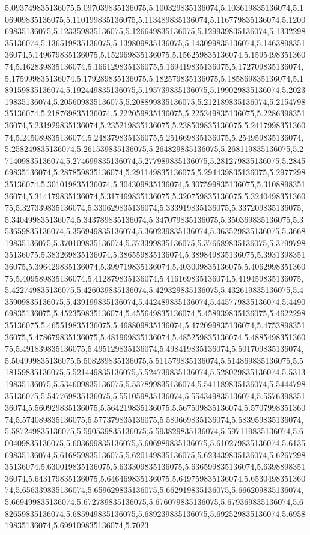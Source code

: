 5.093749835136075,5.097039835136075,5.100329835136074,5.103619835136074,5.106909835136075,5.110199835136075,5.113489835136074,5.116779835136074,5.120069835136075,5.123359835136075,5.126649835136075,5.129939835136074,5.133229835136074,5.136519835136075,5.139809835136075,5.143099835136074,5.146389835136074,5.149679835136075,5.152969835136075,5.156259835136074,5.159549835136074,5.162839835136074,5.166129835136075,5.169419835136075,5.172709835136074,5.175999835136074,5.179289835136075,5.182579835136075,5.185869835136074,5.189159835136074,5.192449835136075,5.195739835136075,5.199029835136074,5.202319835136074,5.205609835136075,5.208899835136075,5.212189835136074,5.215479835136074,5.218769835136074,5.222059835136075,5.225349835136075,5.228639835136074,5.231929835136074,5.235219835136075,5.238509835136075,5.241799835136074,5.245089835136074,5.248379835136075,5.251669835136075,5.254959835136074,5.258249835136074,5.261539835136075,5.264829835136075,5.268119835136075,5.271409835136074,5.274699835136074,5.277989835136075,5.281279835136075,5.284569835136074,5.287859835136074,5.291149835136075,5.294439835136075,5.297729835136074,5.301019835136074,5.304309835136074,5.307599835136075,5.310889835136074,5.314179835136074,5.317469835136075,5.320759835136075,5.324049835136075,5.327339835136074,5.330629835136074,5.333919835136075,5.337209835136075,5.340499835136074,5.343789835136074,5.347079835136075,5.350369835136075,5.353659835136074,5.356949835136074,5.360239835136074,5.363529835136075,5.366819835136075,5.370109835136074,5.373399835136075,5.376689835136075,5.379979835136075,5.383269835136074,5.386559835136074,5.389849835136075,5.393139835136075,5.396429835136074,5.399719835136074,5.403009835136075,5.406299835136075,5.409589835136074,5.412879835136074,5.416169835136074,5.419459835136075,5.422749835136075,5.426039835136074,5.429329835136075,5.432619835136075,5.435909835136075,5.439199835136074,5.442489835136074,5.445779835136074,5.449069835136075,5.452359835136074,5.455649835136074,5.458939835136075,5.462229835136075,5.465519835136075,5.468809835136074,5.472099835136074,5.475389835136075,5.478679835136075,5.481969835136074,5.485259835136074,5.488549835136075,5.491839835136075,5.495129835136074,5.498419835136074,5.501709835136074,5.504999835136075,5.508289835136075,5.511579835136074,5.514869835136075,5.518159835136075,5.521449835136075,5.524739835136074,5.528029835136074,5.531319835136075,5.534609835136075,5.537899835136074,5.541189835136074,5.544479835136075,5.547769835136075,5.551059835136074,5.554349835136074,5.557639835136074,5.560929835136075,5.564219835136075,5.567509835136074,5.570799835136074,5.574089835136075,5.577379835136075,5.580669835136074,5.583959835136074,5.587249835136075,5.590539835136075,5.593829835136074,5.597119835136074,5.600409835136075,5.603699835136075,5.606989835136075,5.610279835136074,5.613569835136074,5.616859835136075,5.620149835136075,5.623439835136074,5.626729835136074,5.630019835136075,5.633309835136075,5.636599835136074,5.639889835136074,5.643179835136075,5.646469835136075,5.649759835136074,5.653049835136074,5.656339835136074,5.659629835136075,5.662919835136075,5.666209835136074,5.669499835136074,5.672789835136075,5.676079835136075,5.679369835136074,5.682659835136074,5.685949835136075,5.689239835136075,5.692529835136074,5.695819835136074,5.699109835136074,5.7023